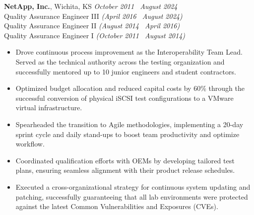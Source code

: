 \documentclass[10pt,letterpaper]{article}       %
\begin{document}
\textbf{NetApp, Inc.}, Wichita, KS \hfill \textit{October 2011 \textendash\ August 2024} \\
\vspace{1pt}
Quality Assurance Engineer III \textit{(April 2016 \textendash\ August 2024)} \\
Quality Assurance Engineer II \textit{(August 2014 \textendash\ April 2016)} \\
Quality Assurance Engineer I \textit{(October 2011 \textendash\ August 2014)} \\
\begin{itemize}
  \item Drove continuous process improvement as the Interoperability Team Lead. Served as the technical authority across the testing organization and successfully mentored up to 10 junior engineers and student contractors.
  \item Optimized budget allocation and reduced capital costs by 60\% through the successful conversion of physical iSCSI test configurations to a VMware virtual infrastructure.
  \item Spearheaded the transition to Agile methodologies, implementing a 20-day sprint cycle and daily stand-ups to boost team productivity and optimize workflow.
  \item Coordinated qualification efforts with OEMs by developing tailored test plans, ensuring seamless alignment with their product release schedules.
  \item Executed a cross-organizational strategy for continuous system updating and patching, successfully guaranteeing that all lab environments were protected against the latest Common Vulnerabilities and Exposures (CVEs).

\end{itemize}
\end{document}
